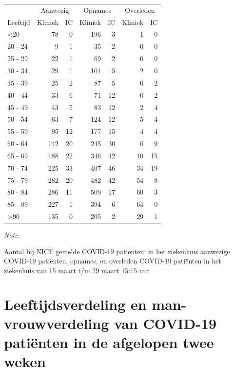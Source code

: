 \documentclass[
  english,
  man,floatsintext]{apa6}
\begin{document}
\begin{table}
\centering\begingroup\fontsize{10}{12}\selectfont

\begin{threeparttable}
\begin{tabular}{lrrrrrr}
\toprule
\multicolumn{1}{c}{ } & \multicolumn{2}{c}{Aanwezig} & \multicolumn{2}{c}{Opnames} & \multicolumn{2}{c}{Overleden} \\
\cmidrule(l{3pt}r{3pt}){2-3} \cmidrule(l{3pt}r{3pt}){4-5} \cmidrule(l{3pt}r{3pt}){6-7}
Leeftijd & Kliniek & IC & Kliniek & IC & Kliniek & IC\\
\midrule
<20 & 78 & 0 & 196 & 3 & 1 & 0\\
20 - 24 & 9 & 1 & 35 & 2 & 0 & 0\\
25 - 29 & 22 & 1 & 69 & 2 & 0 & 0\\
30 - 34 & 29 & 1 & 101 & 5 & 2 & 0\\
35 - 39 & 25 & 2 & 87 & 5 & 0 & 2\\
40 - 44 & 33 & 6 & 71 & 12 & 0 & 2\\
45 - 49 & 43 & 5 & 83 & 12 & 2 & 4\\
50 - 54 & 63 & 7 & 124 & 12 & 5 & 4\\
55 - 59 & 95 & 12 & 177 & 15 & 4 & 4\\
60 - 64 & 142 & 20 & 245 & 30 & 6 & 9\\
65 - 69 & 188 & 22 & 346 & 42 & 10 & 15\\
70 - 74 & 225 & 33 & 407 & 46 & 34 & 19\\
75 - 79 & 282 & 20 & 482 & 42 & 54 & 8\\
80 - 84 & 286 & 11 & 509 & 17 & 60 & 3\\
85 - 89 & 227 & 1 & 394 & 6 & 64 & 0\\
>90 & 135 & 0 & 205 & 2 & 29 & 1\\
\bottomrule
\end{tabular}
\begin{tablenotes}
\item \textit{Note: } 
\item Aantal bij NICE gemelde COVID-19 patiënten: in het ziekenhuis aanwezige COVID-19 patiënten, opnames, en overleden COVID-19 patiënten in het ziekenhuis van 15 maart t/m 29 maart 15:15 uur
\end{tablenotes}
\end{threeparttable}
\endgroup{}
\end{table}

\newpage

\hypertarget{leeftijdsverdeling-en-man-vrouwverdeling-van-covid-19-patiuxebnten-in-de-afgelopen-twee-weken}{%
\section{Leeftijdsverdeling en man-vrouwverdeling van COVID-19 patiënten in de afgelopen twee weken}\label{leeftijdsverdeling-en-man-vrouwverdeling-van-covid-19-patiuxebnten-in-de-afgelopen-twee-weken}}
\end{document}

